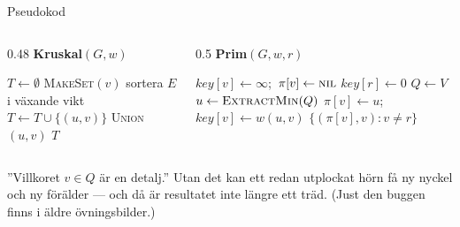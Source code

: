 \begin{frame}{Pseudokod}
\begin{columns}[T]
\begin{column}{0.48\textwidth}
{\small\bfseries\color{kthnavy}Kruskal$(G,w)$}
\footnotesize
\begin{algorithmic}[1]
\State $T\gets\emptyset$
 \State \textsc{MakeSet}$(v)$ \EndFor
\State sortera $E$ i växande vikt
    \State $T\gets T\cup\{(u,v)\}$
    \State \textsc{Union}$(u,v)$
  \EndIf
\EndFor
\State \Return $T$
\end{algorithmic}
\end{column}
\begin{column}{0.5\textwidth}
{\small\bfseries\color{kthnavy}Prim$(G,w,r)$}
\footnotesize
\begin{algorithmic}[1]
 \State $\mathit{key}[v]\gets\infty$;\ $\pi[v]\gets\textsc{nil}$ \EndFor
\State $\mathit{key}[r]\gets0$
\State $Q\gets V$ 
  \State $u\gets\textsc{ExtractMin}(Q)$
      \State $\pi[v]\gets u$;\ $\mathit{key}[v]\gets w(u,v)$ 
    \EndIf
  \EndFor
\EndWhile
\State \Return $\{(\pi[v],v) : v\neq r\}$
\end{algorithmic}
\end{column}
\end{columns}
\vfill
\begin{missbox}
”Villkoret $v\in Q$ är en detalj.” Utan det kan ett redan utplockat hörn få ny nyckel
och ny förälder — och då är resultatet inte längre ett träd. (Just den buggen finns i
äldre övningsbilder.)
\end{missbox}
\end{frame}



